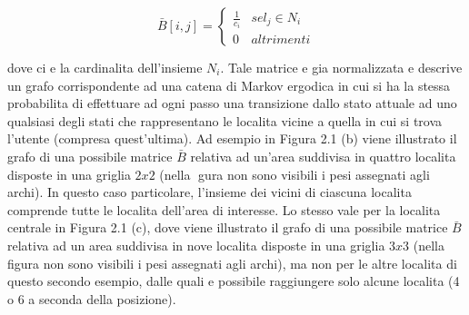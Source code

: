 \begin{equation}
\bar{B}[i,j] =
\left\{\begin{matrix}
\frac{1}{c_{i}} & se l_{j} \in N_{i}\\
0 & altrimenti
\end{matrix}\right.
\end{equation}

dove ci e la cardinalita dell'insieme $N_{i}$. Tale matrice e gia normalizzata e
descrive un grafo corrispondente ad una catena di Markov ergodica in cui si
ha la stessa probabilita di effettuare ad ogni passo una transizione dallo stato
attuale ad uno qualsiasi degli stati che rappresentano le localita vicine a quella
in cui si trova l'utente (compresa quest'ultima).
Ad esempio in Figura 2.1 (b) viene illustrato il grafo di una possibile matrice
$\bar{B}$ relativa ad un'area suddivisa in quattro localita disposte in una griglia
$2 x 2$ (nella gura non sono visibili i pesi assegnati agli archi). In questo caso
particolare, l'insieme dei vicini di ciascuna localita comprende tutte le localita
dell'area di interesse. Lo stesso vale per la localita centrale in Figura 2.1 (c),
dove viene illustrato il grafo di una possibile matrice $\bar{B}$ relativa ad un area
suddivisa in nove localita disposte in una griglia $3 x 3$ (nella figura non sono
visibili i pesi assegnati agli archi), ma non per le altre localita di questo secondo
esempio, dalle quali e possibile raggiungere solo alcune localita (4 o 6 a seconda
della posizione).

